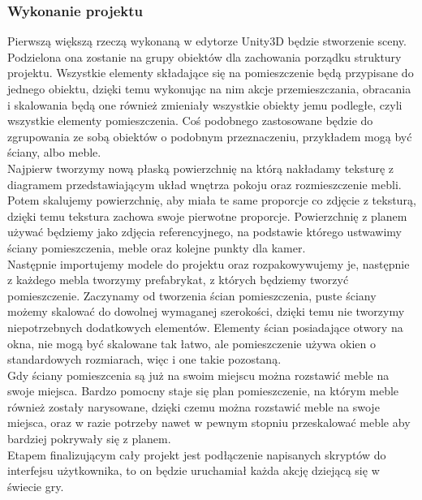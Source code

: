 \documentclass{article} %
\begin{document}
        \subsubsection{Wykonanie projektu}
            Pierwszą większą rzeczą wykonaną w edytorze Unity3D będzie stworzenie sceny. Podzielona ona zostanie na grupy obiektów dla zachowania porządku struktury projektu. Wszystkie elementy składające się na pomieszczenie będą przypisane do jednego obiektu, dzięki temu wykonując na nim akcje przemieszczania, obracania i skalowania będą one również zmieniały wszystkie obiekty jemu podległe, czyli wszystkie elementy pomieszczenia. Coś podobnego zastosowane będzie do zgrupowania ze sobą obiektów o podobnym przeznaczeniu, przykładem mogą być ściany, albo meble.
            \\
            
            Najpierw tworzymy nową płaską powierzchnię na którą nakładamy teksturę z diagramem przedstawiającym układ wnętrza pokoju oraz rozmieszczenie mebli. Potem skalujemy powierzchnię, aby miała te same proporcje co zdjęcie z teksturą, dzięki temu tekstura zachowa swoje pierwotne proporcje. Powierzchnię z planem używać będziemy jako zdjęcia referencyjnego, na podstawie którego ustwawimy ściany pomieszczenia, meble oraz kolejne punkty dla kamer.
            \\
            
            Następnie importujemy modele do projektu oraz rozpakowywujemy je, następnie z każdego mebla tworzymy prefabrykat, z których będziemy tworzyć pomieszczenie. Zaczynamy od tworzenia ścian pomieszczenia, puste ściany możemy skalować do dowolnej wymaganej szerokości, dzięki temu nie tworzymy niepotrzebnych dodatkowych elementów. Elementy ścian posiadające otwory na okna, nie mogą być skalowane tak łatwo, ale pomieszczenie używa okien o standardowych rozmiarach, więc i one takie pozostaną.
            \\
            
            Gdy ściany pomieszcenia są już na swoim miejscu można rozstawić meble na swoje miejsca. Bardzo pomocny staje się plan pomieszczenie, na którym meble również zostały narysowane, dzięki czemu można rozstawić meble na swoje miejsca, oraz w razie potrzeby nawet w pewnym stopniu przeskalować meble aby bardziej pokrywały się z planem.
            \\
            
            Etapem finalizującym cały projekt jest podłączenie napisanych skryptów do interfejsu użytkownika, to on będzie uruchamiał każda akcję dziejącą się w świecie gry.
            \\
        
\end{document}
